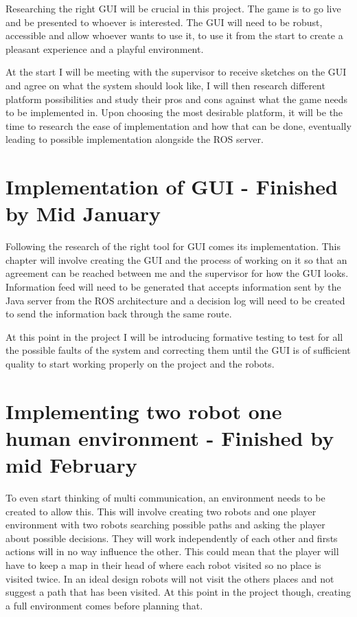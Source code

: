 \documentclass{report}
\begin{document}
  	Researching the right GUI will be crucial in this project. The game is to go live and be presented to whoever is interested. The GUI will need to be robust, accessible and allow whoever wants to use it, to use it from the start to create a pleasant experience and a playful environment.

  	At the start I will be meeting with the supervisor to receive sketches on the GUI and agree on what the system should look like, I will then research different platform possibilities and study their pros and cons against what the game needs to be implemented in. Upon choosing the most desirable platform, it will be the time to research the ease of implementation and how that can be done, eventually leading to possible implementation alongside the ROS server.

  	\section{Implementation of GUI - Finished by Mid January}

  	Following the research of the right tool for GUI comes its implementation. This chapter will involve creating the GUI and the process of working on it so that an agreement can be reached between me and the supervisor for how the GUI looks. Information feed will need to be generated that accepts information sent by the Java server from the ROS architecture and a decision log will need to be created to send the information back through the same route.

  	At this point in the project I will be introducing formative testing to test for all the possible faults of the system and correcting them until the GUI is of sufficient quality to start working properly on the project and the robots.

  	\section{Implementing two robot one human environment - Finished by mid February}

  	To even start thinking of multi communication, an environment needs to be created to allow this. This will involve creating two robots and one player environment with two robots searching possible paths and asking the player about possible decisions. They will work independently of each other and firsts actions will in no way influence the other. This could mean that the player will have to keep a map in their head of where each robot visited so no place is visited twice. In an ideal design robots will not visit the others places and not suggest a path that has been visited. At this point in the project though, creating a full environment comes before planning that.
\end{document}
